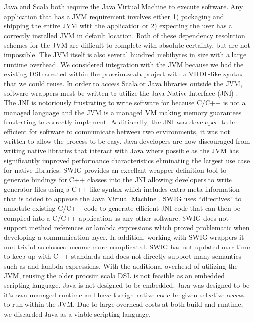 Java and Scala both require the Java Virtual Machine to execute software. Any application that has a JVM requirement involves either 1) packaging and shipping the entire JVM with the application or 2) expecting the user has a correctly installed JVM in default location. Both of these dependency resolution schemes for the JVM are difficult to complete with absolute certainty, but are not impossible. The JVM itself is also several hundred mebibytes in size with a large runtime overhead. We considered integration with the JVM because we had the existing DSL created within the procsim.scala project with a VHDL-like syntax that we could reuse. In order to access Scala or Java libraries outside the JVM, software wrappers must be written to utilize the Java Native Interface (JNI) \cite{Oracle:JNI}. The JNI is notoriously frustrating to write software for because C/C++ is not a managed language and the JVM is a managed VM making memory guarantees frustrating to correctly implement. Additionally, the JNI was developed to be efficient for software to communicate between two environments, it was not written to allow the process to be easy. Java developers are now discouraged from writing native libraries that interact with Java where possible as the JVM has significantly improved performance characteristics eliminating the largest use case for native libraries. SWIG provides an excellent wrapper definition tool to generate bindings for C++ classes into the JNI \cite{SWIG:Homepage} allowing developers to write generator files using a C++-like syntax which includes extra meta-information that is added to appease the Java Virtual Machine \cite{SWIG:Java}. SWIG uses ``directives'' to annotate existing C/C++ code to generate efficient JNI code that can then be compiled into a C/C++ application as any other software. SWIG does not support method references or lambda expressions which proved problematic when developing a communication layer. In addition, working with SWIG wrappers it non-trivial as classes become more complicated. SWIG has not updated over time to keep up with C++ standards and does not directly support many semantics such as  and lambda expressions. With the additional overhead of utilizing the JVM, reusing the older procsim.scala DSL is not feasible as an embedded scripting language. Java is not designed to be embedded. Java was designed to be it's own managed runtime and have foreign native code be given selective access to run within the JVM. Due to large overhead costs at both build and runtime, we discarded Java as a viable scripting language.

